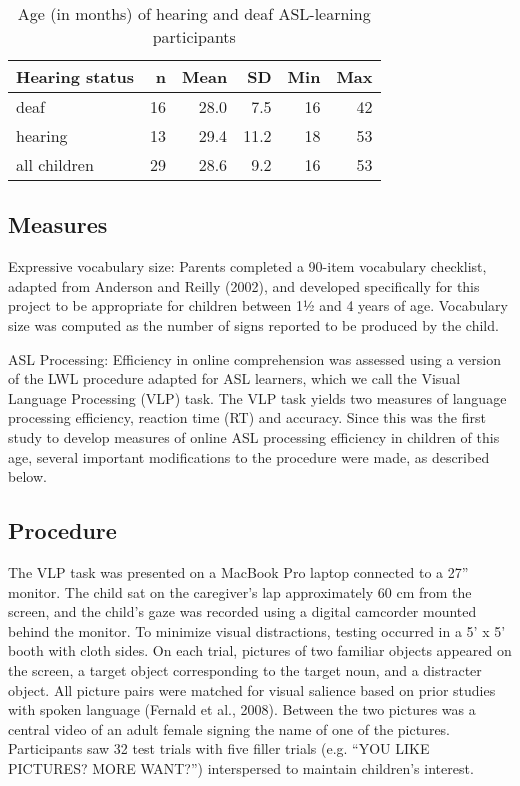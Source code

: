 \documentclass[oneside]{report}
\begin{document}
\begingroup\fontsize{12}{14}\selectfont
\begin{longtable}[t]{lrrrrr}
\caption[Age of ASL-learning children]{\label{tab:sol-demo-table}Age (in months) of hearing and deaf ASL-learning participants}\\
\toprule
\textbf{Hearing status} & \textbf{n} & \textbf{Mean} & \textbf{SD} & \textbf{Min} & \textbf{Max}\\
\midrule
deaf & 16 & 28.0 & 7.5 & 16 & 42\\
hearing & 13 & 29.4 & 11.2 & 18 & 53\\
\hline
all children & 29 & 28.6 & 9.2 & 16 & 53\\
\bottomrule
\end{longtable}\endgroup{}
\hypertarget{measures}{%
\subsection{Measures}\label{measures}}

Expressive vocabulary size: Parents completed a 90-item vocabulary
checklist, adapted from Anderson and Reilly (2002), and developed
specifically for this project to be appropriate for children between 1½
and 4 years of age. Vocabulary size was computed as the number of signs
reported to be produced by the child.

ASL Processing: Efficiency in online comprehension was assessed using a
version of the LWL procedure adapted for ASL learners, which we call the
Visual Language Processing (VLP) task. The VLP task yields two measures
of language processing efficiency, reaction time (RT) and accuracy.
Since this was the first study to develop measures of online ASL
processing efficiency in children of this age, several important
modifications to the procedure were made, as described below.

\hypertarget{procedure}{%
\subsection{Procedure}\label{procedure}}

The VLP task was presented on a MacBook Pro laptop connected to a 27''
monitor. The child sat on the caregiver's lap approximately 60 cm from
the screen, and the child's gaze was recorded using a digital camcorder
mounted behind the monitor. To minimize visual distractions, testing
occurred in a 5' x 5' booth with cloth sides. On each trial, pictures of
two familiar objects appeared on the screen, a target object
corresponding to the target noun, and a distracter object. All picture
pairs were matched for visual salience based on prior studies with
spoken language (Fernald et al., 2008). Between the two pictures was a
central video of an adult female signing the name of one of the
pictures. Participants saw 32 test trials with five filler trials (e.g.
``YOU LIKE PICTURES? MORE WANT?'') interspersed to maintain children's
interest.
\end{document}
